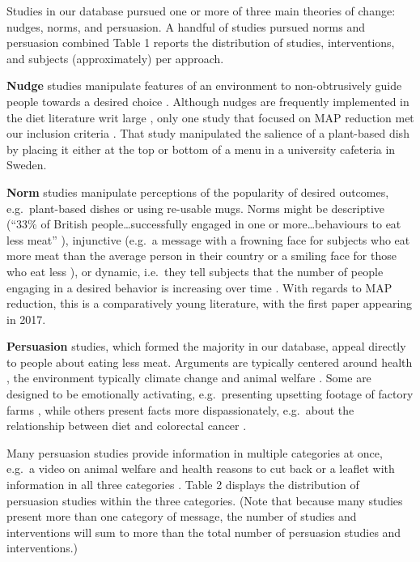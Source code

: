 \documentclass[sn-nature,pdflatex]{sn-jnl}
\begin{document}
Studies in our database pursued one or more of three main theories of
change: nudges, norms, and persuasion. A handful of studies pursued
norms and persuasion combined Table 1 reports the distribution of
studies, interventions, and subjects (approximately) per approach.

\textbf{Nudge} studies manipulate features of an environment to
non-obtrusively guide people towards a desired choice
\citep{thaler2009}. Although nudges are frequently implemented in the
diet literature writ large
\citep{olafsson2024, cadario2020, szaszi2018}, only one study that
focused on MAP reduction met our inclusion criteria
\citep{andersson2021}. That study manipulated the salience of a
plant-based dish by placing it either at the top or bottom of a menu in
a university cafeteria in Sweden.

\textbf{Norm} studies manipulate perceptions of the popularity of
desired outcomes, e.g.~plant-based dishes \citep{sparkman2021} or using
re-usable mugs\citep{loschelder2019}. Norms might be descriptive (``33\%
of British people\ldots successfully engaged in one or
more\ldots behaviours to eat less meat'' \citep{aldoh2023}), injunctive
(e.g.~a message with a frowning face for subjects who eat more meat than
the average person in their country or a smiling face for those who eat
less \citep{alblas2023}), or dynamic, i.e.~they tell subjects that the
number of people engaging in a desired behavior is increasing over time
\citep{aldoh2023, coker2022, sparkman2017, sparkman2020, sparkman2021}.
With regards to MAP reduction, this is a comparatively young literature,
with the first paper appearing in 2017.

\textbf{Persuasion} studies, which formed the majority in our database,
appeal directly to people about eating less meat. Arguments are
typically centered around health \citep{lacroix2020}, the environment
\citep{carfora2023} \textemdash typically climate change \textemdash and
animal welfare \citep{haile2021}. Some are designed to be emotionally
activating, e.g.~presenting upsetting footage of factory farms
\citep{bertolaso2015}, while others present facts more dispassionately,
e.g.~about the relationship between diet and colorectal cancer
\citep{hatami2018}.

Many persuasion studies provide information in multiple categories at
once, e.g.~a video on animal welfare and health reasons to cut back
\citep{feltz2022} or a leaflet with information in all three categories
\citep{hennessy2016}. Table 2 displays the distribution of persuasion
studies within the three categories. (Note that because many studies
present more than one category of message, the number of studies and
interventions will sum to more than the total number of persuasion
studies and interventions.)
\end{document}
